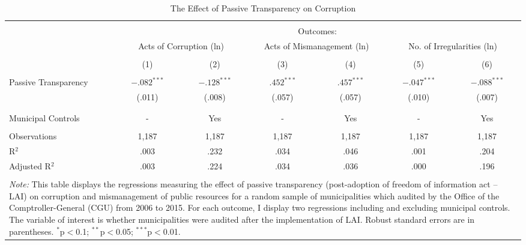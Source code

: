 
\begin{table}[!htbp] \centering
\caption{The Effect of Passive Transparency on Corruption}
\label{tab:corruption1}
\scriptsize
\begin{tabular}{@{\extracolsep{5pt}}lcccccc}
\\[-1.8ex]\hline
\hline \\[-1.8ex]
& \multicolumn{6}{c}{Outcomes:} \T \B \\
\cline{2-7}
& \multicolumn{2}{c}{Acts of Corruption (ln)} & \multicolumn{2}{c}{Acts of Mismanagement (ln)} & \multicolumn{2}{c}{No. of Irregularities (ln)} \T \B \\
\\[-1.8ex] & \multicolumn{1}{c}{(1)} & \multicolumn{1}{c}{(2)} & \multicolumn{1}{c}{(3)} & \multicolumn{1}{c}{(4)} & \multicolumn{1}{c}{(5)} & \multicolumn{1}{c}{(6)} \B\\
\hline \\[-1.8ex]
Passive Transparency & $-.082^{***}$ & $-.128^{***}$ & \hspace{1pt} $.452^{***}$ & \hspace{1pt} $.457^{***}$ & $-.047^{***}$ & $-.088^{***}$ \\
										 & (.011) 		 & (.008) 		 & (.057) 		& (.057) 		 & (.010) 		 & (.007) \\
										 & & & & & & \\
\hline \\[-1.8ex]
Municipal Controls & \multicolumn{1}{c}{-} & \multicolumn{1}{c}{Yes} & \multicolumn{1}{c}{-} & \multicolumn{1}{c}{Yes} & \multicolumn{1}{c}{-} & \multicolumn{1}{c}{Yes} \\
\hline \\[-1.8ex]
Observations & \multicolumn{1}{c}{1,187} & \multicolumn{1}{c}{1,187} & \multicolumn{1}{c}{1,187} & \multicolumn{1}{c}{1,187} & \multicolumn{1}{c}{1,187} & \multicolumn{1}{c}{1,187} \\
R$^{2}$ & \multicolumn{1}{c}{.003} & \multicolumn{1}{c}{.232} & \multicolumn{1}{c}{.034} & \multicolumn{1}{c}{.046} & \multicolumn{1}{c}{.001} & \multicolumn{1}{c}{.204} \\
Adjusted R$^{2}$ & \multicolumn{1}{c}{.003} & \multicolumn{1}{c}{.224} & \multicolumn{1}{c}{.034} & \multicolumn{1}{c}{.036} & \multicolumn{1}{c}{.000} & \multicolumn{1}{c}{.196} \\
\hline
\hline \\[-1.8ex]
\multicolumn{7}{p{.95\textwidth}}{\emph{Note:} This table displays the regressions measuring the effect of passive transparency (post-adoption of freedom of information act -- LAI) on corruption and mismanagement of public resources for a random sample of municipalities which audited by the Office of the Comptroller-General (CGU) from 2006 to 2015. For each outcome, I display two regressions including and excluding municipal controls. The variable of interest is whether municipalities were audited after the implementation of LAI. Robust standard errors are in parentheses. $^{*}$p$<$0.1; $^{**}$p$<$0.05; $^{***}$p$<$0.01.} \\
\end{tabular}
\end{table}

